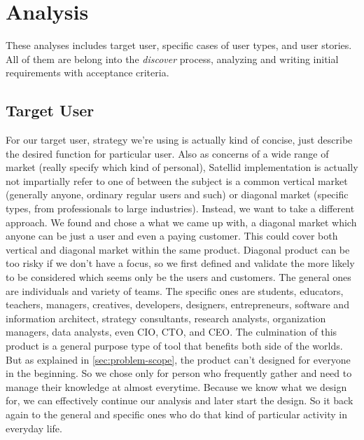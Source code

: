 \section{Analysis}
\label{sec:analysis}

These analyses includes target user, specific cases of user types, and user stories.
All of them are belong into the \textit{discover} process, analyzing and writing initial requirements with acceptance criteria.

\subsection{Target User}

For our target user, strategy we're using is actually kind of concise, just describe the desired function for particular user.
Also as concerns of a wide range of market (really specify which kind of personal), Satellid implementation is actually not impartially refer to one of between the subject is a common vertical market (generally anyone, ordinary regular users and such) or diagonal market (specific types, from professionals to large industries).
Instead, we want to take a different approach.
We found and chose a what we came up with, a diagonal market which anyone can be just a user and even a paying customer.
This could cover both vertical and diagonal market within the same product.
Diagonal product can be too risky if we don't have a focus, so we first defined and validate the more likely to be considered which seems only be the users and customers.
The general ones are individuals and variety of teams.
The specific ones are students, educators, teachers, managers, creatives, developers, designers, entrepreneurs, software and information architect, strategy consultants, research analysts, organization managers, data analysts, even \ac{CIO}, \ac{CTO}, and \ac{CEO}.
The culmination of this product is a general purpose type of tool that benefits both side of the worlds.
But as explained in \autoref{sec:problem-scope}, the product can't designed for everyone in the beginning.
So we chose only for person who frequently gather and need to manage their knowledge at almost everytime.
Because we know what we design for, we can effectively continue our analysis and later start the design.
So it back again to the general and specific ones who do that kind of particular activity in everyday life.

